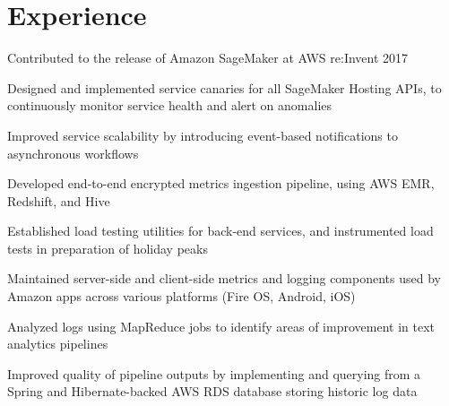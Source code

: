 \documentclass[]{deedy-resume-openfont}
\begin{document}
\begin{minipage}[t]{0.64\textwidth} 

\smallgap
\gap
\gap
\section{Experience}

\vspace{\topsep} %
\begin{tightemize}
\item Contributed to the release of Amazon SageMaker at AWS re:Invent 2017
\item Designed and implemented service canaries for all SageMaker Hosting APIs, to continuously monitor service health and alert on anomalies
\item Improved service scalability by introducing event-based notifications to asynchronous workflows
\end{tightemize}
\sectionsep

\begin{tightemize}
\item Developed end-to-end encrypted metrics ingestion pipeline, using AWS EMR, Redshift, and Hive
\item Established load testing utilities for back-end services, and instrumented load tests in preparation of holiday peaks
\item Maintained server-side and client-side metrics and logging components used by Amazon apps across various platforms (Fire OS, Android, iOS)
\end{tightemize}
\sectionsep

\begin{tightemize}
\item Analyzed logs using MapReduce jobs to identify areas of improvement in text analytics pipelines
\item Improved quality of pipeline outputs by implementing and querying from a Spring and Hibernate-backed AWS RDS database storing historic log data
\end{tightemize}
\sectionsep


\end{minipage}
\end{document}
